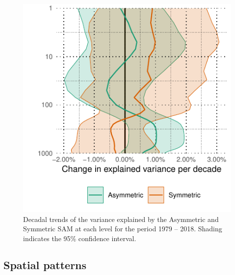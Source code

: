 \documentclass[smallextended]{svjour3}       %
\begin{document}
\begin{figure}
\includegraphics{r-squared-trend-1} \caption{Decadal trends of the variance explained by the Asymmetric and Symmetric SAM at each level for the period 1979 -- 2018. Shading indicates the 95\% confidence interval.}\label{fig:r-squared-trend}
\end{figure}

\hypertarget{spatial}{%
\subsection{Spatial patterns}\label{spatial}}
\end{document}
